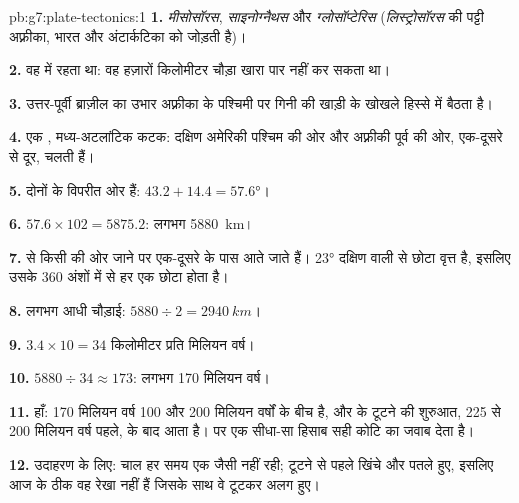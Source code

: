 \begin{solution}{pb:g7:plate-tectonics:1}
\textbf{1.} \emph{मीसोसॉरस}, \emph{साइनोग्नैथस} और \emph{ग्लोसॉप्टेरिस}
(\emph{लिस्ट्रोसॉरस} की पट्टी अफ़्रीका, भारत और अंटार्कटिका को जोड़ती है)।

\textbf{2.} वह  में रहता था: वह हज़ारों किलोमीटर चौड़ा खारा 
पार नहीं कर सकता था।

\textbf{3.} उत्तर-पूर्वी ब्राज़ील का उभार अफ़्रीका के पश्चिमी  पर गिनी की
खाड़ी के खोखले हिस्से में बैठता है।

\textbf{4.} एक , मध्य-अटलांटिक कटक: दक्षिण अमेरिकी  पश्चिम की
ओर और अफ़्रीकी  पूर्व की ओर, एक-दूसरे से दूर, चलती हैं।

\textbf{5.} दोनों   के विपरीत ओर हैं:
$43.2 + 14.4 = \ang{57.6}$।

\textbf{6.} $57.6 \times 102 = 5875.2$: लगभग \qty{5880}{km}।

\textbf{7.}  से किसी  की ओर जाने पर  एक-दूसरे के पास
आते जाते हैं। \ang{23} दक्षिण वाली   से छोटा वृत्त है,
इसलिए उसके 360 अंशों में से हर एक छोटा होता है।

\textbf{8.} लगभग आधी चौड़ाई: $5880 \div 2 = \qty{2940}{km}$।

\textbf{9.} $3.4 \times 10 = 34$ किलोमीटर प्रति मिलियन वर्ष।

\textbf{10.} $5880 \div 34 \approx 173$: लगभग 170 मिलियन वर्ष।

\textbf{11.} हाँ: 170 मिलियन वर्ष 100 और 200 मिलियन वर्षों के बीच है, और
 के टूटने की शुरुआत, 225 से 200 मिलियन वर्ष पहले, के बाद आता है। 
पर एक सीधा-सा हिसाब सही कोटि का
जवाब देता है।

\textbf{12.} उदाहरण के लिए: चाल हर समय एक जैसी नहीं रही; टूटने से पहले 
खिंचे और पतले हुए, इसलिए आज के  ठीक वह रेखा नहीं हैं जिसके साथ वे टूटकर अलग
हुए।
\end{solution}
